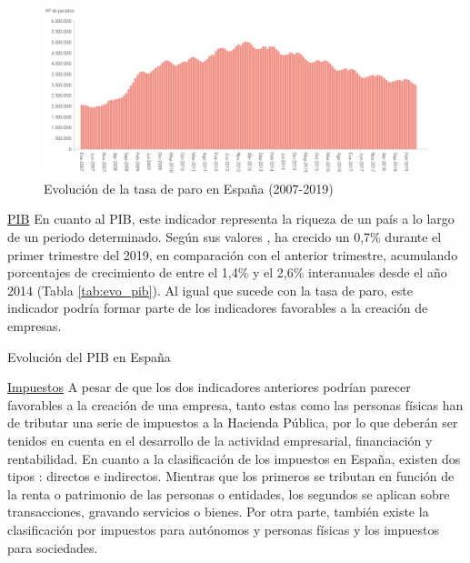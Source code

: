 \begin{figure}[h]
  \centering
  \includegraphics[width=0.9\linewidth]{figures/images/evolucion_paro.PNG}
  \caption{Evolución de la tasa de paro en España (2007-2019)}
  \label{fig:tasaparo}
\end{figure}

\clearpage

\noindent\underline{\acs{PIB}}\newline
\indent En cuanto al \acs{PIB}, este indicador representa la riqueza de un país a lo largo de un periodo determinado. Según sus valores \cite{pibexpansion}, ha crecido un 0,7\% durante el primer trimestre del 2019, en comparación con el anterior trimestre, acumulando porcentajes de crecimiento de entre el 1,4\% y el 2,6\% interanuales desde el año 2014 (Tabla \ref{tab:evo_pib}). Al igual que sucede con la tasa de paro, este indicador podría formar parte de los indicadores favorables a la creación de empresas.

\begin{table}[!htbp]
	\centering
	{\small
		
	}
	\caption[Evolución del \acs{PIB} en España]
	{Evolución del \acs{PIB} en España}
	\label{tab:evo_pib}
\end{table}

\noindent\underline{Impuestos}\newline
\indent A pesar de que los dos indicadores anteriores podrían parecer favorables a la creación de una empresa, tanto estas como las personas físicas han de tributar una serie de impuestos a la Hacienda Pública, por lo que deberán ser tenidos en cuenta en el desarrollo de la actividad empresarial, financiación y rentabilidad. En cuanto a la clasificación de los impuestos en España, existen dos tipos \cite{balcellsg}: directos e indirectos. Mientras que los primeros se tributan en función de la renta o patrimonio de las personas o entidades, los segundos se aplican sobre transacciones, gravando servicios o bienes. Por otra parte, también existe la clasificación por impuestos para autónomos y personas físicas y los impuestos para sociedades.

